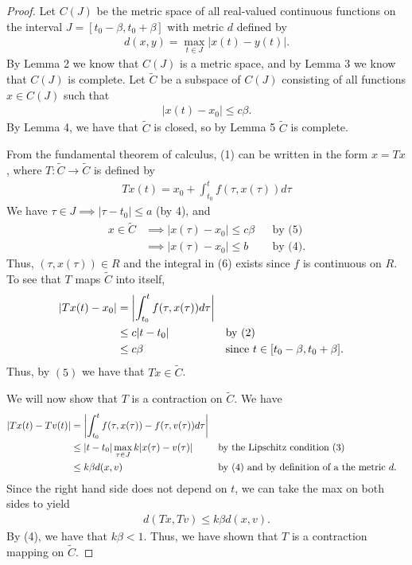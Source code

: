 \documentclass[10pt,a4paper]{article}
\theoremstyle{theorem}
\theoremstyle{definition}
\begin{document}
\begin{proof}
Let $C(J)$ be the metric space of all real-valued continuous functions on the interval $J = [t_0 - \beta, t_0 + \beta]$ with metric $d$ defined by 
\begin{align*}
d(x, y) = \max_{t \in J} |x(t) - y(t)|.
\end{align*}
By Lemma 2 we know that $C(J)$ is a metric space, and by Lemma 3 we know that $C(J)$ is complete.  Let $\tilde{C}$ be a subspace of $C(J)$ consisting of all functions $x \in C(J)$ such that 
\begin{align}
|x(t) - x_0| \leq c \beta.
\end{align}
By Lemma 4,  we have that $\tilde{C}$ is closed, so by Lemma 5 $\tilde{C}$ is complete.

From the fundamental theorem of calculus, (1) can be written in the form $x = Tx$, where $T: \tilde{C} \to \tilde{C}$ is defined by 
\begin{align}
Tx(t) = x_0 + \int_{t_0}^{t} f(\tau, x(\tau))d \tau
\end{align}
We have $\tau \in J \implies |\tau - t_0| \leq a$ (by 4), and 
\begin{align*}
x \in \tilde{C} &\implies |x(\tau) - x_0| \leq c \beta &&\text{by (5)}\\
&\implies |x(\tau) - x_0| \leq b &&\text{by (4)}.
\end{align*}
Thus, $(\tau, x(\tau)) \in R$ and the integral in (6) exists since $f$ is continuous on $R$. To see that $T$ maps $\tilde{C}$ into itself,
\begin{align*}
|Tx(t) - x_0| &= \left|\int_{t_0}^{t} f(\tau, x(\tau))d \tau \Large\right|\\
&\leq c|t - t_0| && \text{by (2)}\\
&\leq c \beta && \text{since } t \in [t_0 - \beta, t_0 + \beta].
\end{align*}
Thus, by $(5)$ we have that $Tx \in \tilde{C}$.

We will now show that $T$ is a contraction on $\tilde{C}$. We have
\begin{align*}
|Tx(t) - Tv(t)| &= \left|\int_{t_0}^{t} f(\tau, x(\tau)) - f(\tau, v(\tau))d \tau \Large\right|\\
&\leq |t - t_0| \max_{\tau \in J} k|x(\tau) - v(\tau)| && \text{by the Lipschitz condition (3)}\\
&\leq k \beta d(x, v) && \text{by (4) and by definition of a the metric } d.
\end{align*}
Since the right hand side does not depend on $t$, we can take the max on both sides to yield 
\begin{align*}
d(Tx, Tv) \leq k \beta d(x, v).
\end{align*}
By (4), we have that $k \beta < 1$. Thus, we have shown that $T$ is a contraction mapping on $\tilde{C}$.


\end{proof}
\end{document}
